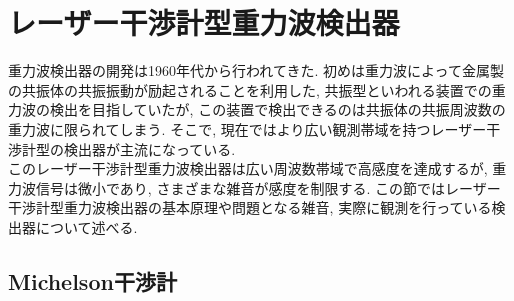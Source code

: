 \section{レーザー干渉計型重力波検出器}
重力波検出器の開発は1960年代から行われてきた. 初めは重力波によって金属製の共振体の共振振動が励起されることを利用した, 共振型といわれる装置での重力波の検出を目指していたが, この装置で検出できるのは共振体の共振周波数の重力波に限られてしまう. そこで, 現在ではより広い観測帯域を持つレーザー干渉計型の検出器が主流になっている. \\
\quad このレーザー干渉計型重力波検出器は広い周波数帯域で高感度を達成するが, 重力波信号は微小であり, さまざまな雑音が感度を制限する. この節ではレーザー干渉計型重力波検出器の基本原理や問題となる雑音, 実際に観測を行っている検出器について述べる. 
\subsection{Michelson干渉計}
